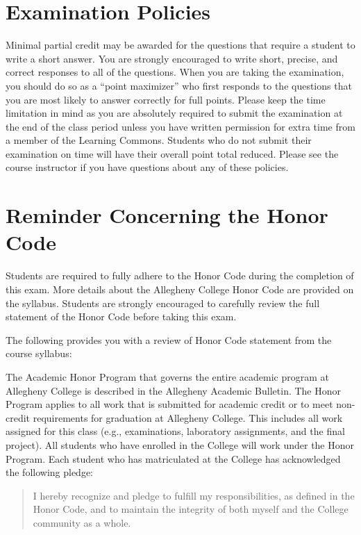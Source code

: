 \section*{Examination Policies}

\vspace*{-.05in}
\noindent Minimal partial credit may be awarded for the questions that require a student to write a short answer. You
are strongly encouraged to write short, precise, and correct responses to all of the questions. When you are taking the
examination, you should do so as a ``point maximizer'' who first responds to the questions that you are most likely to
answer correctly for full points. Please keep the time limitation in mind as you are absolutely required to submit the
examination at the end of the class period unless you have written permission for extra time from a member of the
Learning Commons. Students who do not submit their examination on time will have their overall point total reduced.
Please see the course instructor if you have questions about any of these policies.

\vspace*{-.15in}
\section*{Reminder Concerning the Honor Code}

\noindent Students are required to fully adhere to the Honor Code during the completion of this exam. More details about
the Allegheny College Honor Code are provided on the syllabus. Students are strongly encouraged to carefully review the
full statement of the Honor Code before taking this exam.

\noindent The following provides you with a review of Honor Code statement from the course syllabus:

The Academic Honor Program that governs the entire academic program at Allegheny College is described in the Allegheny
Academic Bulletin.  The Honor Program applies to all work that is submitted for academic credit or to meet non-credit
requirements for graduation at Allegheny College.  This includes all work assigned for this class (e.g., examinations,
laboratory assignments, and the final project).  All students who have enrolled in the College will work under the Honor
Program.  Each student who has matriculated at the College has acknowledged the following pledge:

\vspace*{-.11in}
\begin{quote}
  I hereby recognize and pledge to fulfill my responsibilities, as defined in the Honor Code, and to maintain the
  integrity of both myself and the College community as a whole.
\end{quote}
\vspace*{-.11in}

